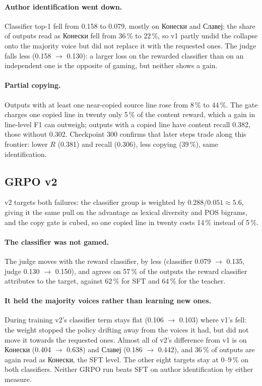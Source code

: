 \documentclass[11pt]{article}
\begin{document}
\paragraph{Author identification went down.} Classifier top-1 fell from 0.158
to 0.079, mostly on Конески and Славеј; the share of outputs read as Конески
fell from 36\,\% to 22\,\%, so v1 partly undid the collapse onto the majority
voice but did not replace it with the requested ones. The judge falls less
(0.158 $\to$ 0.130): a larger loss on the rewarded classifier than on an
independent one is the opposite of gaming, but neither shows a gain.

\paragraph{Partial copying.} Outputs with at least one near-copied source line
rose from 8\,\% to 44\,\%. The gate charges one copied line in twenty only
5\,\% of the content reward, which a gain in line-level F1 can outweigh;
outputs with a copied line have content recall 0.382, those without 0.302.
Checkpoint 300 confirms that later steps trade along this frontier: lower $R$
(0.381) and recall (0.306), less copying (39\,\%), same identification.

\subsection{GRPO v2}

v2 targets both failures: the classifier group is weighted by
$0.288/0.051\approx5.6$, giving it the same pull on the advantage as lexical
diversity and POS bigrams, and the copy gate is cubed, so one copied line in
twenty costs 14\,\% instead of 5\,\%.

\paragraph{The classifier was not gamed.} The judge moves with the reward
classifier, by less (classifier 0.079 $\to$ 0.135, judge 0.130 $\to$ 0.150),
and agrees on 57\,\% of the outputs the reward classifier attributes to the
target, against 62\,\% for SFT and 64\,\% for the teacher.

\paragraph{It held the majority voices rather than learning new ones.} During
training v2's classifier term stays flat (0.106 $\to$ 0.103) where v1's fell:
the weight stopped the policy drifting away from the voices it had, but did not
move it towards the requested ones. Almost all of v2's difference from v1 is
on Конески (0.404 $\to$ 0.638) and Славеј (0.186 $\to$ 0.442), and 36\,\% of
outputs are again read as Конески, the SFT level. The other eight targets stay
at 0--9\,\% on both classifiers. Neither GRPO run beats SFT on author
identification by either measure.
\end{document}
